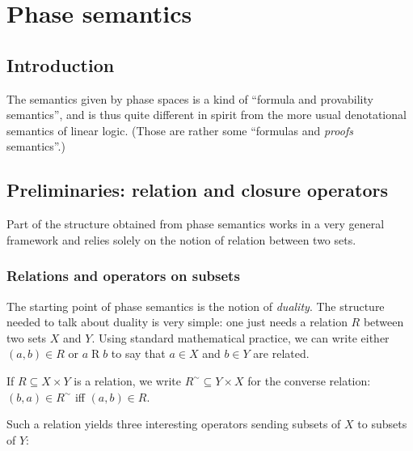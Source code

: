 \chapter{Phase semantics}\label{phase-semantics}

\section{Introduction}\label{introduction}

The semantics given by phase spaces is a kind of ``formula and
provability semantics'', and is thus quite different in spirit from the
more usual denotational semantics of linear logic. (Those are rather
some ``formulas and \emph{proofs} semantics''.)


\section{Preliminaries: relation and closure operators}\label{preliminaries-relation-and-closure-operators}

Part of the structure obtained from phase semantics works in a very
general framework and relies solely on the notion of relation between
two sets.

\subsection{Relations and operators on subsets}\label{relations-and-operators-on-subsets}

The starting point of phase semantics is the notion of \emph{duality}.
The structure needed to talk about duality is very simple: one just
needs a relation \(R\) between two sets \(X\) and \(Y\). Using standard
mathematical practice, we can write either \((a,b) \in R\) or
\(a\mathrel{R} b\) to say that \(a\in X\) and \(b\in Y\) are related.

\begin{definition}
If $R\subseteq X\times Y$ is a relation, we write $R^\sim\subseteq Y\times X$ for the converse relation: $(b,a)\in R^\sim$ iff $(a,b)\in R$.
\end{definition}

Such a relation yields three interesting operators sending subsets of
\(X\) to subsets of \(Y\):

